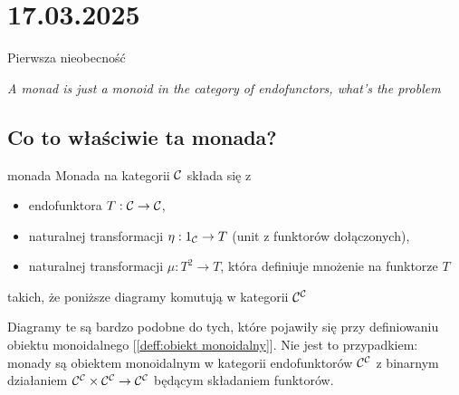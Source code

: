 \section{17.03.2025}{Pierwsza nieobecność}

\begin{adjustwidth}{200pt}{0pt}
\begin{flushright}\slshape
  A monad is just a monoid in the category of endofunctors, what's the problem
\end{flushright}
\end{adjustwidth}

\subsection{Co to właściwie ta monada?}

\begin{definition}{monada}{}
  Monada na kategorii $\mathcal{C}$ składa się z
  \begin{itemize}
    \item endofunktora $T:\mathcal{C}\to\mathcal{C}$,
    \item naturalnej transformacji $\eta:1_{\mathcal{C}}\to T$ (unit z funktorów dołączonych),
    \item naturalnej transformacji $\mu:T^2\to T$, która definiuje mnożenie na funktorze $T$
  \end{itemize}
  takich, że poniższe diagramy komutują w kategorii $\mathcal{C}^{\mathcal{C}}$
  \begin{center}
  \end{center}
\end{definition}

Diagramy te są bardzo podobne do tych, które pojawiły się przy definiowaniu obiektu monoidalnego [\ref{deff:obiekt monoidalny}]. Nie jest to przypadkiem: monady są obiektem monoidalnym w kategorii endofunktorów $\mathcal{C}^{\mathcal{C}}$ z binarnym działaniem $\mathcal{C}^{\mathcal{C}}\times\mathcal{C}^{\mathcal{C}}\to \mathcal{C}^{\mathcal{C}}$ będącym składaniem funktorów.

